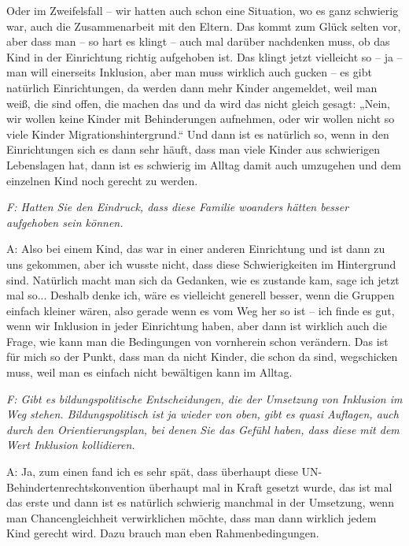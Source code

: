 \begin{linenumbers*}
Oder im Zweifelsfall – wir hatten auch schon eine Situation, wo es ganz schwierig war, auch die Zusammenarbeit mit den Eltern. Das kommt zum Glück selten vor, aber dass man – so hart es klingt – auch mal darüber nachdenken muss, ob das Kind in der Einrichtung richtig aufgehoben ist. Das klingt jetzt vielleicht so -- ja – man will einerseits Inklusion, aber man muss wirklich auch gucken – es gibt natürlich Einrichtungen, da werden dann mehr Kinder angemeldet, weil man weiß, die sind offen, die machen das und da wird das nicht gleich gesagt: „Nein, wir wollen keine Kinder mit Behinderungen aufnehmen, oder wir wollen nicht so viele Kinder Migrationshintergrund.“ Und dann ist es natürlich so, wenn in den Einrichtungen sich es dann sehr häuft, dass man viele Kinder aus schwierigen Lebenslagen hat, dann ist es schwierig im Alltag damit auch umzugehen und dem einzelnen Kind noch gerecht zu werden. 

\emph{F: Hatten Sie den Eindruck, dass diese Familie woanders hätten besser aufgehoben sein können.}

A: Also bei einem Kind, das war in einer anderen Einrichtung und ist dann zu uns gekommen, aber ich wusste nicht, dass diese Schwierigkeiten im Hintergrund sind. Natürlich macht man sich da Gedanken, wie es zustande kam, sage ich jetzt mal so... Deshalb denke ich, wäre es vielleicht generell besser, wenn die Gruppen einfach kleiner wären, also gerade wenn es vom Weg her so ist -- ich finde es gut, wenn wir Inklusion in jeder Einrichtung haben, aber dann ist wirklich auch die Frage, wie kann man die Bedingungen von vornherein schon verändern. Das ist für mich so der Punkt, dass man da nicht Kinder, die schon da sind, wegschicken muss, weil man es einfach nicht bewältigen kann im Alltag. 

\emph{F: Gibt es bildungspolitische Entscheidungen, die der Umsetzung von Inklusion im Weg stehen. Bildungspolitisch ist ja wieder von oben, gibt es quasi Auflagen, auch durch den Orientierungsplan, bei denen Sie das Gefühl haben, dass diese mit dem Wert Inklusion kollidieren.}

A: Ja, zum einen fand ich es sehr spät, dass überhaupt diese UN-Behindertenrechtskonvention überhaupt mal in Kraft gesetzt wurde, das ist mal das erste und dann ist es natürlich schwierig manchmal in der Umsetzung, wenn man Chancengleichheit verwirklichen möchte, dass man dann wirklich jedem Kind gerecht wird. Dazu brauch man eben Rahmenbedingungen. 


\end{linenumbers*}
